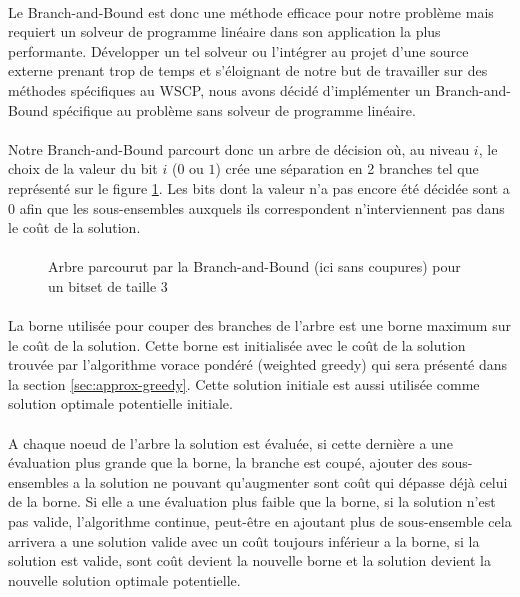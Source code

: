 \documentclass[12pt,letterpaper,twoside]{article}
\begin{document}
			\paragraph*{}
				Le Branch-and-Bound est donc une méthode efficace pour notre problème mais requiert un solveur de programme linéaire dans son application la plus performante. Développer un tel solveur ou l'intégrer au projet d'une source externe prenant trop de temps et s'éloignant de notre but de travailler sur des méthodes spécifiques au WSCP, nous avons décidé d'implémenter un Branch-and-Bound spécifique au problème sans solveur de programme linéaire.
			\paragraph*{}
				Notre Branch-and-Bound parcourt donc un arbre de décision où, au niveau \(i\), le choix de la valeur du bit \(i\) (\(0\) ou \(1\)) crée une séparation en 2 branches tel que représenté sur le figure \ref{fig:bnb}. Les bits dont la valeur n'a pas encore été décidée sont a \(0\) afin que les sous-ensembles auxquels ils correspondent n'interviennent pas dans le coût de la solution.
			\paragraph*{}
			\begin{figure}[H]
				\centering%
				\resizebox{0.75\textwidth}{!}{}%
				\caption{Arbre parcourut par la Branch-and-Bound (ici sans coupures) pour un bitset de taille 3}%
				\label{fig:bnb}%
			\end{figure}
			\paragraph*{}
				La borne utilisée pour couper des branches de l'arbre est une borne maximum sur le coût de la solution. Cette borne est initialisée avec le coût de la solution trouvée par l'algorithme vorace pondéré (weighted greedy) qui sera présenté dans la section \ref{sec:approx-greedy}. Cette solution initiale est aussi utilisée comme solution optimale potentielle initiale.
			\paragraph*{}
				A chaque noeud de l'arbre la solution est évaluée, si cette dernière a une évaluation plus grande que la borne, la branche est coupé, ajouter des sous-ensembles a la solution ne pouvant qu'augmenter sont coût qui dépasse déjà celui de la borne. Si elle a une évaluation plus faible que la borne, si la solution n'est pas valide, l'algorithme continue, peut-être en ajoutant plus de sous-ensemble cela arrivera a une solution valide avec un coût toujours inférieur a la borne, si la solution est valide, sont coût devient la nouvelle borne et la solution devient la nouvelle solution optimale potentielle.
\end{document}
